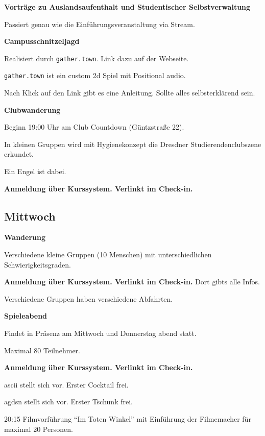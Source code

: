 \documentclass[a4paper,12pt]{scrreprt}
\begin{document}
\textbf{Vorträge zu Auslandsaufenthalt und Studentischer Selbstverwaltung}
\begin{itemize*}
    \item Passiert genau wie die Einführungsveranstaltung via Stream.
\end{itemize*}

\textbf{Campusschnitzeljagd}
\begin{itemize*}
    \item Realisiert durch \texttt{gather.town}. Link dazu auf der Webseite.
    \item \texttt{gather.town} ist ein custom 2d Spiel mit Positional audio.
    \item Nach Klick auf den Link gibt es eine Anleitung. Sollte alles selbsterklärend sein.
\end{itemize*}

\textbf{Clubwanderung}
\begin{itemize*}
    \item Beginn 19:00 Uhr am Club Countdown (Güntzstraße 22).
    \item In kleinen Gruppen wird mit Hygienekonzept die Dresdner Studierendenclubszene erkundet.
    \item Ein Engel ist dabei.
    \item \textbf{Anmeldung über Kurssystem. Verlinkt im Check-in.}
\end{itemize*}


\subsection{Mittwoch}

\textbf{Wanderung}
\begin{itemize*}
    \item Verschiedene kleine Gruppen (10 Menschen) mit unterschiedlichen Schwierigkeitsgraden.
    \item \textbf{Anmeldung über Kurssystem. Verlinkt im Check-in.} Dort gibts alle Infos.
    \item Verschiedene Gruppen haben verschiedene Abfahrten.
\end{itemize*}


\textbf{Spieleabend}
\begin{itemize*}
    \item Findet in Präsenz am Mittwoch und Donnerstag abend statt.
    \item Maximal 80 Teilnehmer.
    \item \textbf{Anmeldung über Kurssystem. Verlinkt im Check-in.}
    \item ascii stellt sich vor. Erster Cocktail frei.
    \item agdsn stellt sich vor. Erster Tschunk frei.
    \item 20:15 Filmvorführung \enquote{Im Toten Winkel} mit Einführung der Filmemacher für maximal 20 Personen.
\end{itemize*}
\end{document}
